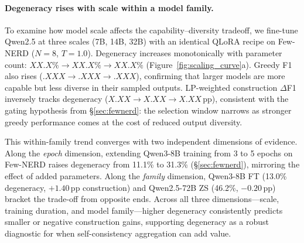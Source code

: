 
\newcommand{\scaleSevenDegen}{XX.X}    %
\newcommand{\scaleFourteenDegen}{XX.X} %
\newcommand{\scaleThirtytwoDegen}{XX.X}%
\newcommand{\scaleSevenGreedy}{.XXX}   %
\newcommand{\scaleFourteenGreedy}{.XXX}%
\newcommand{\scaleThirtytwoGreedy}{.XXX}%
\newcommand{\scaleSevenConstr}{X.XX}   %
\newcommand{\scaleFourteenConstr}{X.XX}%
\newcommand{\scaleThirtytwoConstr}{X.XX}%
\newcommand{\scaleSevenLP}{.XXX}       %
\newcommand{\scaleFourteenLP}{.XXX}    %
\newcommand{\scaleThirtytwoLP}{.XXX}   %


\paragraph{Degeneracy rises with scale within a model family.}
To examine how model scale affects the capability--diversity tradeoff, we fine-tune Qwen2.5 at three scales (7B, 14B, 32B) with an identical QLoRA recipe on Few-NERD ($N{=}8$, $T{=}1.0$).
Degeneracy increases monotonically with parameter count: $\scaleSevenDegen\%\to\scaleFourteenDegen\%\to\scaleThirtytwoDegen\%$ (Figure~\ref{fig:scaling_curve}a).
Greedy F1 also rises ($\scaleSevenGreedy\to\scaleFourteenGreedy\to\scaleThirtytwoGreedy$), confirming that larger models are more capable but less diverse in their sampled outputs.
LP-weighted construction $\Delta$F1 inversely tracks degeneracy ($\scaleSevenConstr\to\scaleFourteenConstr\to\scaleThirtytwoConstr$\,pp), consistent with the gating hypothesis from \S\ref{sec:fewnerd}: the selection window narrows as stronger greedy performance comes at the cost of reduced output diversity.

This within-family trend converges with two independent dimensions of evidence.
Along the \emph{epoch} dimension, extending Qwen3-8B training from 3 to 5 epochs on Few-NERD raises degeneracy from 11.1\% to 31.3\% (\S\ref{sec:fewnerd}), mirroring the effect of added parameters.
Along the \emph{family} dimension, Qwen3-8B FT (13.0\% degeneracy, $+1.40$\,pp construction) and Qwen2.5-72B ZS (46.2\%, $-0.20$\,pp) bracket the trade-off from opposite ends.
Across all three dimensions---scale, training duration, and model family---higher degeneracy consistently predicts smaller or negative construction gains, supporting degeneracy as a robust diagnostic for when self-consistency aggregation can add value.
